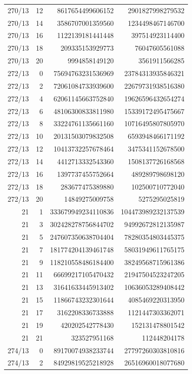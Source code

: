 \begin{longtable}{@{}rrrr@{}}
270/13 & 12 & 8617654499606152 & 2901827998279532\\
270/13 & 14 & 3586707001359560 & 1234498467146700\\
270/13 & 16 & 1122139181441448 & 397514923114400\\
270/13 & 18 & 209335153929773 & 76047605561088\\
270/13 & 20 & 9994858149120 & 3561911566285\\
272/13 & 0 & 75694763231536969 & 23784313935846321\\
272/13 & 2 & 72061084733939600 & 22679731938516380\\
272/13 & 4 & 62061145663752840 & 19626596432654274\\
272/13 & 6 & 48106300833811980 & 15339172495475667\\
272/13 & 8 & 33224761135661160 & 10716495807805970\\
272/13 & 10 & 20131503079832508 & 6593948466171192\\
272/13 & 12 & 10413732257678464 & 3475341152678500\\
272/13 & 14 & 4412713332543360 & 1508137726168568\\
272/13 & 16 & 1397737455752664 & 489289798698120\\
272/13 & 18 & 283677475389880 & 102500710772040\\
272/13 & 20 & 14849275009758 & 5275295025819\\
21 & 1 & 333679949234110836 & 104473989232137539\\
21 & 3 & 302428278756844702 & 94992672812135987\\
21 & 5 & 247607350638704404 & 78280354803445375\\
21 & 7 & 181774204139461748 & 58031949611765175\\
21 & 9 & 118210558486184400 & 38249568715961386\\
21 & 11 & 66699217105470432 & 21947504523247205\\
21 & 13 & 31641633445913402 & 10636053289408442\\
21 & 15 & 11866743232301644 & 4085469220313950\\
21 & 17 & 3162208336733888 & 1121447303362071\\
21 & 19 & 420202542778430 & 152131478801542\\
21 & 21 & 323527951168 & 112448204178\\
274/13 & 0 & 89170074938233744 & 27797260303810816\\
274/13 & 2 & 84929819525218928 & 26516960018077680\\

\end{longtable}
